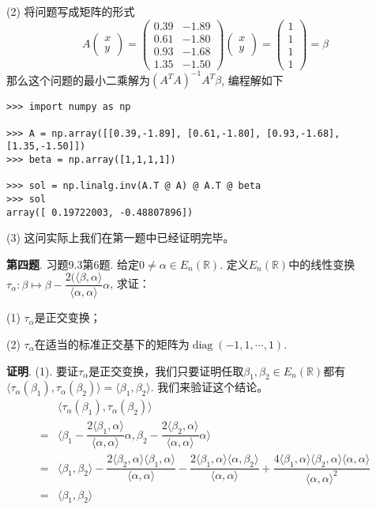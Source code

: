 (2) 将问题写成矩阵的形式
$$A\begin{pmatrix}
x \\ y
\end{pmatrix} = \begin{pmatrix}
0.39 & -1.89 \\ 0.61 & -1.80 \\ 0.93 & -1.68 \\ 1.35 & -1.50
\end{pmatrix}
\begin{pmatrix}
x \\ y
\end{pmatrix} = 
\begin{pmatrix}
1 \\ 1 \\ 1 \\ 1
\end{pmatrix} = \beta
$$
那么这个问题的最小二乘解为$(A^TA)^{-1}A^T\beta$, 编程解如下
\begin{lstlisting}
>>> import numpy as np

>>> A = np.array([[0.39,-1.89], [0.61,-1.80], [0.93,-1.68], [1.35,-1.50]])
>>> beta = np.array([1,1,1,1])

>>> sol = np.linalg.inv(A.T @ A) @ A.T @ beta
>>> sol
array([ 0.19722003, -0.48807896])
\end{lstlisting}

(3) 这问实际上我们在第一题中已经证明完毕。


\newpageorvspace


{\bf 第四题}. 习题9.3第6题. 给定$0 \neq \alpha \in E_n(\mathbb{R})$. 定义$E_n(\mathbb{R})$中的线性变换$\tau_{\alpha}: \beta \mapsto \beta - \dfrac{2(\langle \beta, \alpha \rangle}{\langle \alpha, \alpha \rangle} \alpha$, 求证：

(1) $\tau_{\alpha}$是正交变换；

(2) $\tau_{\alpha}$在适当的标准正交基下的矩阵为$\operatorname{diag}(-1, 1, \cdots, 1)$.

\newpageorvspace

{\bf 证明}. (1). 要证$\tau_{\alpha}$是正交变换，我们只要证明任取$\beta_1, \beta_2 \in E_n(\mathbb{R})$都有$\langle \tau_{\alpha}(\beta_1), \tau_{\alpha}(\beta_2) \rangle = \langle \beta_1, \beta_2 \rangle$. 我们来验证这个结论。
\begin{align*}
& \langle \tau_{\alpha}(\beta_1), \tau_{\alpha}(\beta_2) \rangle \\
= & \langle \beta_1 - \dfrac{2\langle \beta_1, \alpha \rangle}{\langle \alpha, \alpha \rangle} \alpha, \beta_2 - \dfrac{2\langle \beta_2, \alpha \rangle}{\langle \alpha, \alpha \rangle} \alpha  \rangle \\
= & \langle \beta_1, \beta_2 \rangle - \dfrac{2\langle \beta_2, \alpha \rangle \langle \beta_1, \alpha \rangle}{\langle \alpha, \alpha \rangle}- \dfrac{2\langle \beta_1, \alpha \rangle \langle \alpha, \beta_2 \rangle}{\langle \alpha, \alpha \rangle} + \dfrac{4\langle \beta_1, \alpha \rangle \langle \beta_2, \alpha \rangle \langle \alpha, \alpha \rangle}{\langle \alpha, \alpha \rangle^2} \\
= & \langle \beta_1, \beta_2 \rangle
\end{align*}

